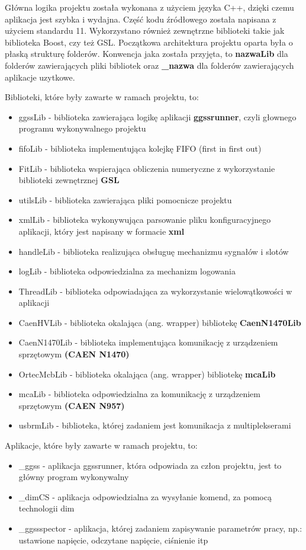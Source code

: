 Główna logika projektu została wykonana z użyciem języka C++, dzięki czemu aplikacja jest szybka i wydajna. Część kodu źródłowego została napisana z użyciem standardu 11. Wykorzystano również zewnętrzne biblioteki takie jak biblioteka Boost, czy też GSL. Początkowa architektura projektu oparta była o płaską strukturę folderów. Konwencja jaka została przyjęta, to \textbf{nazwaLib} dla folderów zawierających pliki bibliotek oraz \textbf{\_nazwa} dla folderów zawierających aplikacje uzytkowe.\par
\bigskip
Biblioteki, które były zawarte w ramach projektu, to:
\begin{itemize}
\item ggssLib - biblioteka zawierająca logikę aplikacji \textbf{ggssrunner}, czyli głownego programu wykonywalnego projektu
\item fifoLib - biblioteka implementująca kolejkę FIFO (first in first out)
\item FitLib - biblioteka wspierająca obliczenia numeryczne z wykorzystanie biblioteki zewnętrznej \textbf{GSL}
\item utilsLib - biblioteka zawierająca pliki pomocnicze projektu
\item xmlLib - biblioteka wykonywująca parsowanie pliku konfiguracyjnego aplikacji, który jest napisany w formacie \textbf{xml}
\item handleLib - biblioteka realizująca obsługuę mechanizmu sygnałów i slotów
\item logLib - biblioteka odpowiedzialna za mechanizm logowania
\item ThreadLib - biblioteka odpowiadająca za wykorzystanie wielowątkowości w aplikacji
\item CaenHVLib - biblioteka okalająca (ang. wrapper) bibliotekę \textbf{CaenN1470Lib}
\item CaenN1470Lib - biblioteka implementująca komunikację z urządzeniem sprzętowym \textbf{(CAEN N1470)}
\item OrtecMcbLib - biblioteka okalająca (ang. wrapper) bibliotekę \textbf{mcaLib}
\item mcaLib - biblioteka odpowiedzialna za komunikację z urządzeniem sprzętowym \textbf{(CAEN N957)}
\item usbrmLib - biblioteka, której zadaniem jest komunikacja z multiplekserami
\end{itemize}

\par Aplikacje, które były zawarte w ramach projektu, to:
\begin{itemize}
\item \_ggss - aplikacja ggssrunner, która odpowiada za człon projektu, jest to główny program wykonywalny
\item \_dimCS - aplikacja odpowiedzialna za wysyłanie komend, za pomocą technologii dim
\item \_ggssspector - aplikacja, której zadaniem zapisywanie parametrów pracy, np.: ustawione napięcie, odczytane napięcie, ciśnienie itp
\end{itemize}

